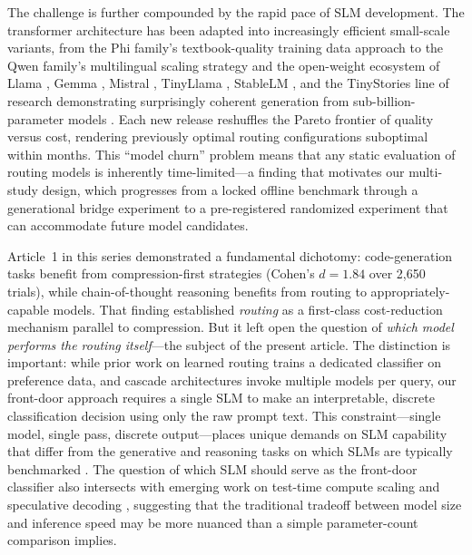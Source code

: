 \documentclass{article}
\begin{document}
The challenge is further compounded by the rapid pace of SLM development. The transformer architecture \citep{vaswani2017attention} has been adapted into increasingly efficient small-scale variants, from the Phi family's textbook-quality training data approach \citep{gunasekar2023phi1,li2023phi15,javaheripi2023phi2,abdin2024phi3,abdin2024phi4} to the Qwen family's multilingual scaling strategy \citep{yang2024qwen2,yang2024qwen25} and the open-weight ecosystem of Llama \citep{touvron2023llama2,meta2024llama3}, Gemma \citep{gemma2024gemma2,gemma2024gemma}, Mistral \citep{jiang2023mistral,jiang2024mixtral}, TinyLlama \citep{zhang2024tinyllama}, StableLM \citep{zhu2024stablelm}, and the TinyStories line of research demonstrating surprisingly coherent generation from sub-billion-parameter models \citep{eldan2023tinystories}. Each new release reshuffles the Pareto frontier of quality versus cost, rendering previously optimal routing configurations suboptimal within months. This ``model churn'' problem means that any static evaluation of routing models is inherently time-limited---a finding that motivates our multi-study design, which progresses from a locked offline benchmark through a generational bridge experiment to a pre-registered randomized experiment that can accommodate future model candidates.

Article~1 in this series \citep{johnson2026compress} demonstrated a fundamental dichotomy: code-generation tasks benefit from compression-first strategies (Cohen's $d = 1.84$ over 2,650 trials), while chain-of-thought reasoning benefits from routing to appropriately-capable models. That finding established \emph{routing} as a first-class cost-reduction mechanism parallel to compression. But it left open the question of \emph{which model performs the routing itself}---the subject of the present article. The distinction is important: while prior work on learned routing \citep{jiang2023routellm,ong2025routellm} trains a dedicated classifier on preference data, and cascade architectures \citep{madaan2023automix,yue2024cascades} invoke multiple models per query, our front-door approach requires a single SLM to make an interpretable, discrete classification decision using only the raw prompt text. This constraint---single model, single pass, discrete output---places unique demands on SLM capability that differ from the generative and reasoning tasks on which SLMs are typically benchmarked \citep{hendrycks2021mmlu,clark2018arc,zellers2019hellaswag,bigcode2023evaluation,austin2021mbpp}. The question of which SLM should serve as the front-door classifier also intersects with emerging work on test-time compute scaling \citep{snell2024testtime} and speculative decoding \citep{leviathan2023speculative,chen2023speculative}, suggesting that the traditional tradeoff between model size and inference speed may be more nuanced than a simple parameter-count comparison implies.
\end{document}
